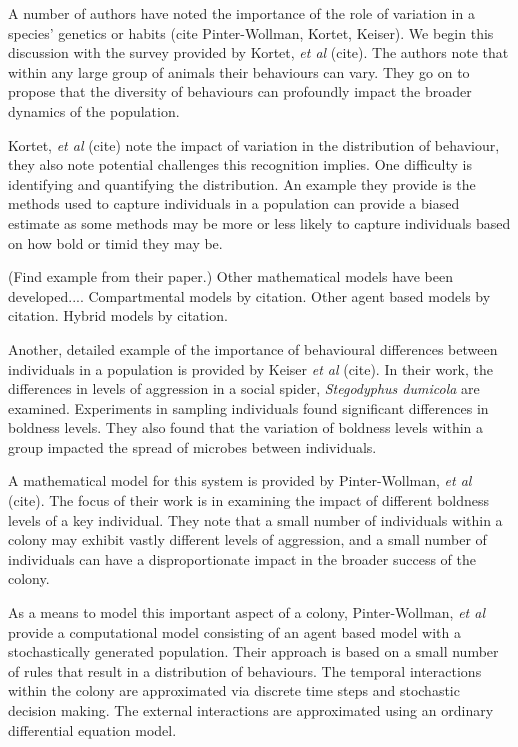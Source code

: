 \documentclass[12pt]{article}
\begin{document}
A number of authors have noted the importance of the role of variation
in a species' genetics or habits (cite Pinter-Wollman, Kortet,
Keiser). We begin this discussion with the survey provided by Kortet,
\textit{et al} (cite). The authors note that within any large group of
animals their behaviours can vary. They go on to propose that the
diversity of behaviours can profoundly impact the broader dynamics of
the population.

Kortet, \textit{et al} (cite) note the impact of variation in the
distribution of behaviour, they also note potential challenges this
recognition implies. One difficulty is identifying and quantifying the
distribution. An example they provide is the methods used to capture
individuals in a population can provide a biased estimate as some
methods may be more or less likely to capture individuals based on how
bold or timid they may be.

(Find example from their paper.)  Other mathematical models have been
developed.... Compartmental models by citation. Other agent based
models by citation. Hybrid models by citation.

Another, detailed example of the importance of behavioural differences
between individuals in a population is provided by Keiser \textit{et
  al} (cite). In their work, the differences in levels of aggression
in a social spider, \textit{Stegodyphus dumicola} are
examined. Experiments in sampling individuals found significant
differences in boldness levels. They also found that the variation of
boldness levels within a group impacted the spread of microbes between
individuals.

A mathematical model for this system is provided by Pinter-Wollman,
\textit{et al} (cite). The focus of their work is in examining the
impact of different boldness levels of a key individual.  They note
that a small number of individuals within a colony may exhibit vastly
different levels of aggression, and a small number of individuals can
have a disproportionate impact in the broader success of the colony.

As a means to model this important aspect of a colony, Pinter-Wollman,
\textit{et al} provide a computational model consisting of an agent
based model with a stochastically generated population. Their approach
is based on a small number of rules that result in a distribution of
behaviours. The temporal interactions within the colony are
approximated via discrete time steps and stochastic decision
making. The external interactions are approximated using an
ordinary differential equation model.
\end{document}
